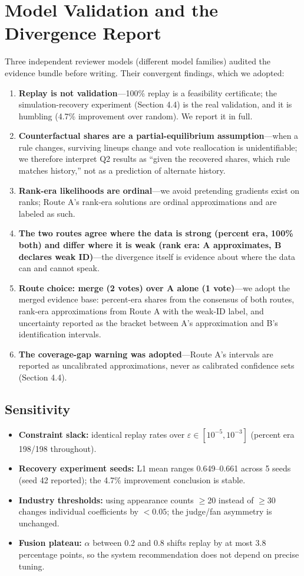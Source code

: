 \documentclass[12pt]{article}
\begin{document}
\section{Model Validation and the Divergence Report}
\label{sec:validation}
Three independent reviewer models (different model families) audited the evidence
bundle before writing. Their convergent findings, which we adopted:
\begin{enumerate}
\item \textbf{Replay is not validation}---100\% replay is a feasibility certificate;
the simulation-recovery experiment (Section 4.4) is the real validation, and it is
humbling (4.7\% improvement over random). We report it in full.
\item \textbf{Counterfactual shares are a partial-equilibrium assumption}---when a
rule changes, surviving lineups change and vote reallocation is unidentifiable; we
therefore interpret Q2 results as ``given the recovered shares, which rule matches
history,'' not as a prediction of alternate history.
\item \textbf{Rank-era likelihoods are ordinal}---we avoid pretending gradients exist
on ranks; Route A's rank-era solutions are ordinal approximations and are labeled as
such.
\item \textbf{The two routes agree where the data is strong (percent era, 100\% both)
and differ where it is weak (rank era: A approximates, B declares weak ID)}---the
divergence itself is evidence about where the data can and cannot speak.
\item \textbf{Route choice: merge (2 votes) over A alone (1 vote)}---we adopt the
merged evidence base: percent-era shares from the consensus of both routes, rank-era
approximations from Route A with the weak-ID label, and uncertainty reported as the
bracket between A's approximation and B's identification intervals.
\item \textbf{The coverage-gap warning was adopted}---Route A's intervals are
reported as uncalibrated approximations, never as calibrated confidence sets
(Section 4.4).
\end{enumerate}

\subsection{Sensitivity}
\begin{itemize}
\item \textbf{Constraint slack:} identical replay rates over $\varepsilon \in
[10^{-5}, 10^{-3}]$ (percent era 198/198 throughout).
\item \textbf{Recovery experiment seeds:} L1 mean ranges 0.649--0.661 across 5 seeds
(seed 42 reported); the 4.7\% improvement conclusion is stable.
\item \textbf{Industry thresholds:} using appearance counts $\ge$20 instead of
$\ge$30 changes individual coefficients by $<0.05$; the judge/fan asymmetry is
unchanged.
\item \textbf{Fusion plateau:} $\alpha$ between 0.2 and 0.8 shifts replay by at
most 3.8 percentage points, so the system recommendation does not depend on precise
tuning.
\end{itemize}
\end{document}
